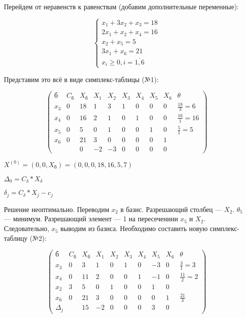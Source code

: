 \documentclass{article}
\begin{document}
Перейдем от неравенств к равенствам (добавим дополнительные переменные):

$$
\begin{cases}
    x_1 + 3x_2 + x_3 = 18 \\
    2x_1 + x_2 + x_4 = 16 \\
    x_2 + x_5 = 5 \\
    3x_1 + x_6 = 21 \\
    x_{i} \ge 0, i = \overline{1, 6}
\end{cases}
$$

Представим это всё в виде симплекс-таблицы (№1):

$$
\begin{pmatrix}
    \text{б} & C_{\text{б}} & X_{\text{б}} & X_1 & X_2 & X_3 & X_4 & X_5 & X_6 & \theta \\
    x_3 & 0 & 18 & 1 & 3 & 1 & 0 & 0 & 0 & \frac{18}{3} = 6\\
    x_4 & 0 & 16 & 2 & 1 & 0 & 1 & 0 & 0 & \frac{16}{1} = 16\\
    x_5 & 0 & 5 & 0 & 1 & 0 & 0 & 1 & 0 & \frac{5}{1} = 5\\
    x_6 & 0 & 21 & 3 & 0 & 0 & 0 & 0 & 1 \\
    & & 0 & -2 & -3 & 0 & 0 & 0 & 0
\end{pmatrix}
$$

$X^{(0)} = (0, 0, X_{\text{б}}) = (0, 0,0, 18, 16, 5, 7)$

$\Delta_{0} = C_{\delta} * X_{\delta}$

$\delta_{j} = C_{\delta} * X_{j} - c_{j}$

Решение неоптимально. Переводим $x_2$ в базис. Разрешающий столбец — $X_{2}$. $\theta_{5}$ — минимум. Разрешающий элемент — 1 на пересеченини $x_5$ и $X_{2}$. Следовательно, $x_5$ выводим из базиса. Необходимо составить новую симплекс-таблицу (№2):

$$
\begin{pmatrix}
    \text{б} & C_{\text{б}} & X_{\text{б}} & X_1 & X_2 & X_3 & X_4 & X_5 & X_6 & \theta \\
    x_3 & 0 & 3 & 1 & 0 & 1 & 0 & -3 & 0 & \frac{3}{1} = 3\\
    x_4 & 0 & 11 & 2 & 0 & 0 & 1 & -1 & 0 & \frac{11}{2} =2\\
    x_2 & 3 & 5 & 0 & 1 & 0 & 0 & 1 & 0 \\
    x_6 & 0 & 21 & 3 & 0 & 0 & 0 & 0 & 1 & \frac{21}{3}\\
    \Delta_{j} & & 15 & -2 & 0 & 0 & 0 & 3 & 0
\end{pmatrix}
$$
\end{document}
